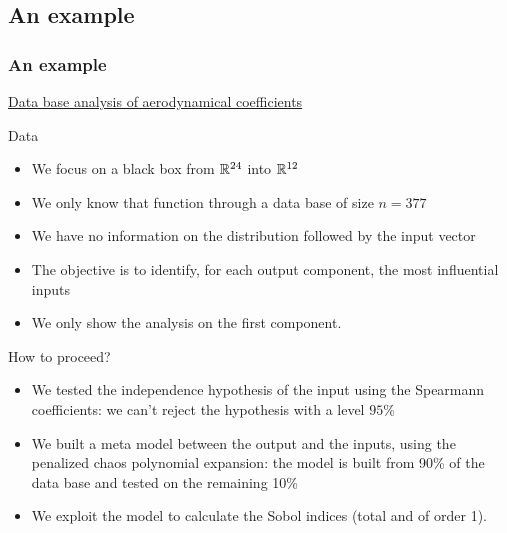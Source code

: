 \documentclass[8pt]{beamer}
\begin{document}
\subsection{An example}


\begin{frame}
  \frametitle{An example}
\small
\underline{Data base analysis of aerodynamical coefficients}

\begin{block}{Data}
  \begin{itemize}
  \item We focus on a black box from ${\mathbb R}^{24}$ into ${\mathbb R}^{12}$
  \item We only know that function through a data base of size $n=377$
  \item We have no information on the distribution followed by the input vector
  \item The objective is to identify, for each output component, the most influential inputs
  \item \alert{We only show the analysis on the first component.}
  \end{itemize}
  \end{block}

\begin{block}{How to proceed?}
  \begin{itemize}
  \item We tested the independence hypothesis of the input using the Spearmann coefficients: we can't reject the hypothesis with a level $95\%$
  \item We built a meta model between the output and the inputs, using the penalized chaos polynomial expansion: the model is built from  90\% of the data base and tested on the remaining 10\%
  \item We exploit the model to calculate the Sobol indices (total and of order 1).
  \end{itemize}
\end{block}

\end{frame}
\end{document}
